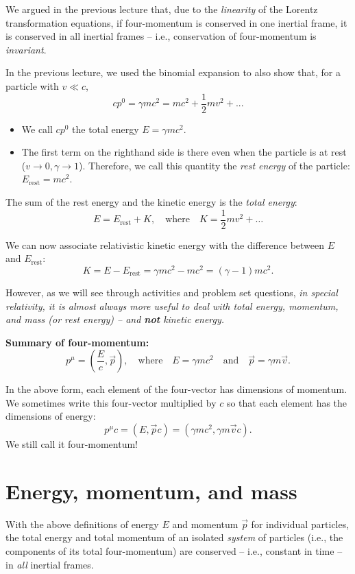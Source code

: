 \documentclass[11pt, letterpaper, openany]{book}
\begin{document}
We argued in the previous lecture that, due to the \textit{linearity} of the Lorentz transformation equations, if four-momentum is conserved in one inertial frame, it is conserved in all inertial frames -- i.e., conservation of four-momentum is \textit{invariant}.

In the previous lecture, we used the binomial expansion to also show that, for a particle with $v \ll c$,
\[ cp^0 = \gamma mc^2 = mc^2 + \frac{1}{2}mv^2 + ... \]
\begin{itemize}
    \item We call $cp^0$ the total energy $E = \gamma mc^2$.
    \item The first term on the righthand side is there even when the particle is at rest ($v \to 0, \gamma \to 1$). Therefore, we call this quantity the \textit{rest energy} of the particle: $E_{\text{rest}} = mc^2$.
\end{itemize}

The sum of the rest energy and the kinetic energy is the \textit{total energy}:
\[ E = E_{\text{rest}} + K, \quad \text{where} \quad K = \frac{1}{2}mv^2 + \dots \]

We can now associate relativistic kinetic energy with the difference between $E$ and $E_{\text{rest}}$:
\[ K = E - E_{\text{rest}} = \gamma mc^2 - mc^2 = (\gamma - 1)mc^2. \]

However, as we will see through activities and problem set questions, \textit{in special relativity, it is almost always more useful to deal with total energy, momentum, and mass (or rest energy) -- and \textbf{not} kinetic energy.}

\textbf{Summary of four-momentum:}
\[ p^\mu = \left(\frac{E}{c}, \vec{p}\right), \quad \text{where} \quad E = \gamma mc^2 \quad \text{and} \quad \vec{p} = \gamma m\vec{v}. \]

In the above form, each element of the four-vector has dimensions of momentum. We sometimes write this four-vector multiplied by $c$ so that each element has the dimensions of energy:
\[ p^\mu c = (E, \vec{p}c) = (\gamma mc^2, \gamma m\vec{v}c). \]
We still call it four-momentum!

\section{Energy, momentum, and mass}

With the above definitions of energy $E$ and momentum $\vec{p}$ for individual particles, the total energy and total momentum of an isolated \textit{system} of particles (i.e., the components of its total four-momentum) are conserved -- i.e., constant in time -- in \textit{all} inertial frames.
\end{document}
